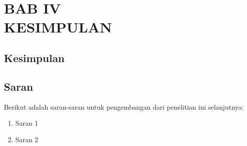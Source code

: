 \section*{\centering BAB IV\\ KESIMPULAN}
\setcounter{section}{4}
\setcounter{subsection}{0}

\subsection{Kesimpulan}

\lipsum[1]

\subsection{Saran}
Berikut adalah saran-saran untuk pengembangan dari penelitian ini selanjutnya:
\begin{enumerate}
    \item Saran 1
    \item Saran 2
\end{enumerate}